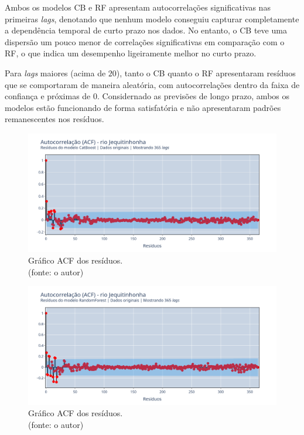 Ambos os modelos CB e RF apresentam autocorrelações significativas nas primeiras \textit{lags}, denotando que nenhum modelo conseguiu capturar completamente a dependência temporal de curto prazo nos dados. No entanto, o CB teve uma dispersão um pouco menor de correlações significativas em comparação com o RF, o que indica um desempenho ligeiramente melhor no curto prazo.

Para \textit{lags} maiores (acima de $20$), tanto o CB quanto o RF apresentaram resíduos que se comportaram de maneira aleatória, com autocorrelações dentro da faixa de confiança e próximas de $0$. Considernado as previsões de longo prazo, ambos os modelos estão funcionando de forma satisfatória e não apresentaram padrões remanescentes nos resíduos.

\begin{figure}[!h]
	\centering
	\includegraphics[scale=0.33]{Figuras/jequiti/wfv/CB/CB_WFV_ORIG_RESID_ACF.png}
	\caption{Gráfico ACF dos resíduos.\\(fonte: o autor)}
	\label{fig:jequiti_CB_WFV_ORIG_RESID_ACF}
\end{figure}

\begin{figure}[!h]
	\centering
	\includegraphics[scale=0.33]{Figuras/jequiti/wfv/RF/RF_WFV_ORIG_RESID_ACF.png}
	\caption{Gráfico ACF dos resíduos.\\(fonte: o autor)}
	\label{fig:jequiti_RF_WFV_ORIG_RESID_ACF}
\end{figure}
\clearpage

